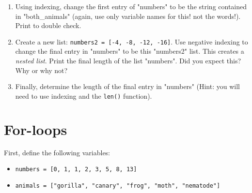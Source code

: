 \documentclass{article}[12pt]
\newcommand{\code}[1]{\texttt{#1}}  %
\begin{document}
\begin{enumerate}
        \item Using indexing, change the first entry of "numbers" to be the string contained in "both\_animals" (again, use only variable names for this! not the words!). Print to double check. 

        \item Create a new list: \code{numbers2 = [-4, -8, -12, -16]}. Use negative indexing to change the final entry in "numbers" to be this "numbers2" list. This creates a \emph{nested list}. Print the final length of the list "numbers". Did you expect this? Why or why not?

        \item Finally, determine the length of the final entry in "numbers" (Hint: you will need to use indexing and the \code{len()} function).
    \end{enumerate}


\section{For-loops}

First, define the following variables: 
\begin{itemize}
    \item \code{numbers = [0, 1, 1, 2, 3, 5, 8, 13]}
    \item \code{animals = ["gorilla", "canary", "frog", "moth", "nematode"]}
\end{itemize}
\end{document}
